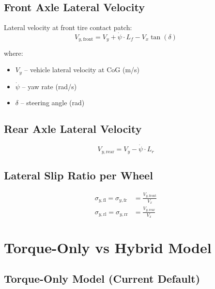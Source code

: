 \documentclass[11pt,a4paper]{article}
\begin{document}
\subsection{Front Axle Lateral Velocity}

Lateral velocity at front tire contact patch:
\begin{equation}
V_{y,\text{front}} = V_y + \dot{\psi} \cdot L_f - V_x \tan(\delta)
\end{equation}

where:
\begin{itemize}
    \item $V_y$ -- vehicle lateral velocity at CoG (m/s)
    \item $\dot{\psi}$ -- yaw rate (rad/s)
    \item $\delta$ -- steering angle (rad)
\end{itemize}

\subsection{Rear Axle Lateral Velocity}

\begin{equation}
V_{y,\text{rear}} = V_y - \dot{\psi} \cdot L_r
\end{equation}

\subsection{Lateral Slip Ratio per Wheel}

\begin{align}
\sigma_{y,\text{fl}} = \sigma_{y,\text{fr}} &= \frac{V_{y,\text{front}}}{V_x} \\
\sigma_{y,\text{rl}} = \sigma_{y,\text{rr}} &= \frac{V_{y,\text{rear}}}{V_x}
\end{align}

\section{Torque-Only vs Hybrid Model}
\label{sec:comparison}

\subsection{Torque-Only Model (Current Default)}
\end{document}

